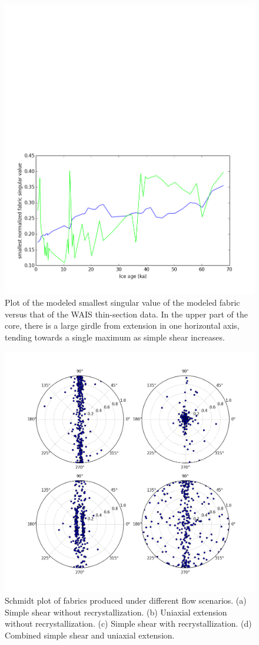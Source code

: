 \documentclass{igs}
\begin{document}
\begin{figure}
   \caption{Plot of the modeled smallest singular value of the modeled fabric versus that of the WAIS thin-section data. In the upper part of the core, there is a large girdle from extension in one horizontal axis, tending towards a single maximum as simple shear increases.} 
\includegraphics[width=12cm]{waisfit}
\end{figure}


\begin{figure}
\caption{Schmidt plot of fabrics produced under different flow scenarios. (a) Simple shear without recrystallization. (b) Uniaxial extension without recrystallization. (c) Simple shear with recrystallization. (d) Combined simple shear and uniaxial extension.} 
\includegraphics[width=12cm]{all4}
\end{figure}
\end{document}
